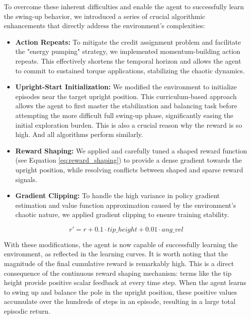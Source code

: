 \documentclass{article}
\begin{document}
To overcome these inherent difficulties and enable the agent to successfully learn the swing-up behavior, we introduced a series of crucial algorithmic enhancements that directly address the environment's complexities:
\begin{itemize}
  \item \textbf{Action Repeats:} To mitigate the credit assignment problem and facilitate the "energy pumping" strategy, we implemented momentum-building action repeats. This effectively shortens the temporal horizon and allows the agent to commit to sustained torque applications, stabilizing the chaotic dynamics.
  \item \textbf{Upright-Start Initialization:} We modified the environment to initialize episodes near the target upright position. This curriculum-based approach allows the agent to first master the stabilization and balancing task before attempting the more difficult full swing-up phase, significantly easing the initial exploration burden. This is also a crucial reason why the reward is so high. And all algorithms perform similarly.
  \item \textbf{Reward Shaping:} We applied and carefully tuned a shaped reward function (see Equation \ref{eq:reward_shaping}) to provide a dense gradient towards the upright position, while resolving conflicts between shaped and sparse reward signals.
  \item \textbf{Gradient Clipping:} To handle the high variance in policy gradient estimation and value function approximation caused by the environment's chaotic nature, we applied gradient clipping to ensure training stability.
\end{itemize}

\begin{equation}
  \label{eq:reward_shaping}
  r' = r + 0.1 \cdot tip\_height + 0.01 \cdot ang\_vel
\end{equation}

With these modifications, the agent is now capable of successfully learning the environment, as reflected in the learning curves. It is worth noting that the magnitude of the final cumulative reward is remarkably high. This is a direct consequence of the continuous reward shaping mechanism: terms like the tip height provide positive scalar feedback at every time step. When the agent learns to swing up and balance the pole in the upright position, these positive values accumulate over the hundreds of steps in an episode, resulting in a large total episodic return.
\end{document}
